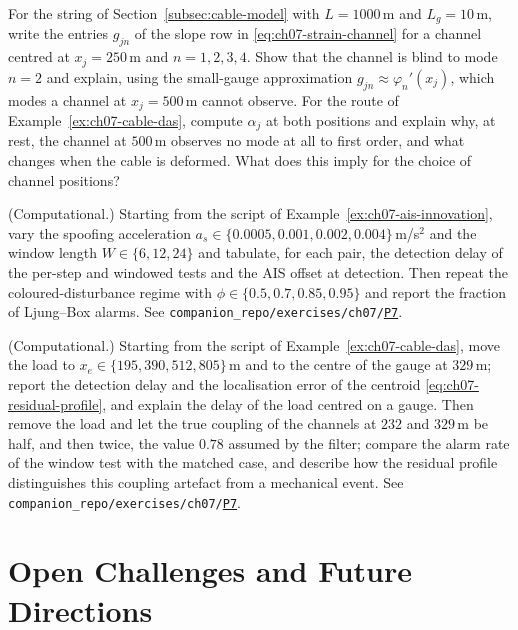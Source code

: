 \documentclass[graybox,envcountchap]{style/SNmono}
\newcommand{\repopath}[1]{\texttt{#1}}
\providecommand{\DIFadd}[1]{{\protect\color{blue} #1}} %
\providecommand{\DIFdel}[1]{{\protect\color{red} #1}} %
\DeclareRobustCommand{\RtwoDel}[1]{{\color{red}%
  \renewcommand{\DIFadd}[1]{##1}\renewcommand{\DIFdel}[1]{##1}%
  #1}}
\DeclareRobustCommand{\RtwoAdd}[1]{{\color{blue}#1}}
\DeclareRobustCommand{\codeentry}[1]{\hyperref[code:#1]{\texttt{#1}}}
\begin{document}
\begin{prob}\label{prob:ch07:5}
For the string of Section~\ref{subsec:cable-model} with $L=1000$\,m and $L_g=10$\,m, write the entries $g_{jn}$ of the slope row in \eqref{eq:ch07-strain-channel} for a channel centred at $x_j=250$\,m and $n=1,2,3,4$. Show that the channel is blind to mode $n=2$ and explain, using the small-gauge approximation $g_{jn}\approx\varphi_n'(x_j)$, which modes a channel at $x_j=500$\,m cannot observe. For the route of Example~\ref{ex:ch07-cable-das}, compute $\alpha_j$ at both positions and explain why, at rest, the channel at $500$\,m observes no mode at all to first order, and what changes when the cable is deformed. What does this imply for the choice of channel positions?
\end{prob}
\begin{prob}\label{prob:ch07:6}
(Computational.) Starting from the script of Example~\ref{ex:ch07-ais-innovation}, vary the spoofing acceleration $a_s\in\{0.0005,0.001,0.002,0.004\}$\,m/s$^{2}$ and the window length $W\in\{6,12,24\}$ and tabulate, for each pair, the detection delay of the per-step and windowed tests and the AIS offset at detection. Then repeat the coloured-disturbance regime with $\phi\in\{0.5,0.7,0.85,0.95\}$ and report the fraction of Ljung--Box alarms. See \RtwoDel{\repopath{companion\_\allowbreak repo/\allowbreak exercises/\allowbreak ch07/\allowbreak }}\RtwoAdd{\codeentry{P7}}.
\end{prob}
\begin{prob}\label{prob:ch07:7}
(Computational.) Starting from the script of Example~\ref{ex:ch07-cable-das}, move the load to $x_e\in\{195,390,512,805\}$\,m and to the centre of the gauge at $329$\,m; report the detection delay and the localisation error of the centroid \eqref{eq:ch07-residual-profile}, and explain the delay of the load centred on a gauge. Then remove the load and let the true coupling of the channels at $232$ and $329$\,m be half, and then twice, the value $0.78$ assumed by the filter; compare the alarm rate of the window test with the matched case, and describe how the residual profile distinguishes this coupling artefact from a mechanical event. See \RtwoDel{\repopath{companion\_\allowbreak repo/\allowbreak exercises/\allowbreak ch07/\allowbreak }}\RtwoAdd{\codeentry{P7}}.
\end{prob}


\clearpage

\clearpage

\chapter{Open Challenges and Future Directions}
\label{sec:open-challenges}
\end{document}
